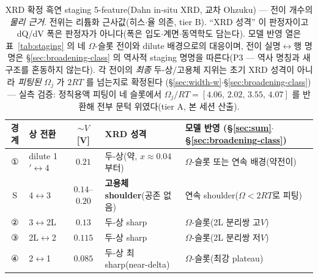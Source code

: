 \begin{table}[t]
\centering\footnotesize
\renewcommand{\arraystretch}{1.3}
\caption{XRD 확정 흑연 staging 5-feature(Dahn in-situ XRD\cite{dahn1991}, 교차 Ohzuku\cite{ohzuku1993}) ---
전이 개수의 \emph{물리 근거}. 전위는 리튬화 근사값(히스$\cdot$율 의존, tier B\cite{dahn1991,ohzuku1993}). ``XRD 성격''
이 판정자이고 dQ/dV 폭은 판정자가 아니다(폭은 입도$\cdot$계면$\cdot$동역학도 담는다). 모델 반영 열은
표~\ref{tab:staging} 의 네 $\Omega$-슬롯 전이와 dilute 배경으로의 대응이며, 전이 실명$\leftrightarrow$행 명명은
\S\ref{sec:broadening-class} 의 역사적 staging 명명을 따른다(P3 --- 역사 명칭과 새 구조를 혼동하지 않는다). 각 전이의
\emph{최종} 두-상/고용체 지위는 초기 XRD 성격이 아니라 \emph{피팅된} $\Omega_j$ 가 $2RT$ 를 넘는지로 확정된다
(\S\ref{sec:width-w}$\cdot$\S\ref{sec:broadening-class}) --- 실측 검증: 정칙용액 피팅이 네 슬롯에서
$\Omega_j/RT=[4.06,\,2.02,\,3.55,\,4.07]$ 를 반환해 전부 문턱 위였다(tier A, 본 세션 산출).}
\label{tab:gr2l-xrd}
\begin{tabular}{@{}c p{} c p{} p{}@{}}
\toprule
경계 & 상 전환 & $\sim V$ [V] & XRD 성격 & 모델 반영 (\S\ref{sec:sum}$\cdot$\S\ref{sec:broadening-class}) \\
\midrule
①  & dilute 1$'\!\leftrightarrow$4 & $0.21$          & 두-상(약, $x\!\approx\!0.04$부터) & $\Omega$-슬롯 또는 연속 배경(약전이) \\
S  & 4$\leftrightarrow$3          & $0.14$--$0.20$  & \textbf{고용체 shoulder}(공존 없음) & 연속 shoulder($\Omega\!<\!2RT$로 피팅) \\
②  & 3$\leftrightarrow$2L         & $0.13$          & 두-상 sharp & $\Omega$-슬롯(2L 분리쌍 고$V$) \\
③  & 2L$\leftrightarrow$2         & $0.115$         & 두-상 sharp & $\Omega$-슬롯(2L 분리쌍 저$V$) \\
④  & 2$\leftrightarrow$1          & $0.085$         & 두-상 최sharp(near-delta) & $\Omega$-슬롯(최강 plateau) \\
\bottomrule
\end{tabular}
\end{table}

